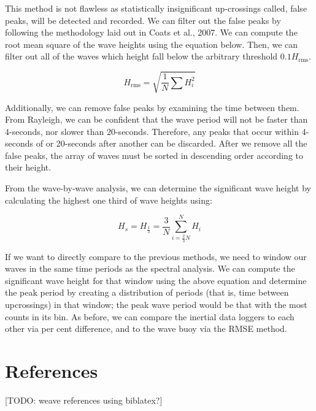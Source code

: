 This method is not flawless as statistically insignificant up-crossings called, false peaks, will be detected and recorded. 
We can filter out the false peaks by following the methodology laid out in Coats et al., 2007. 
We can compute the root mean square of the wave heights using the equation below. 
Then, we can filter out all of the waves which height fall below the arbitrary threshold $0.1H_{\text{rms}}$.

\begin{equation}
    H_{\text{rms}} = \sqrt{\frac{1}{N} \sum{H_i^2}}
\end{equation}

Additionally, we can remove false peaks by examining the time between them. 
From Rayleigh, we can be confident that the wave period will not be faster than 4-seconds, nor slower than 20-seconds. 
Therefore, any peaks that occur within 4-seconds of or 20-seconds after another can be discarded. 
After we remove all the false peaks, the array of waves must be sorted in descending order according to their height.

From the wave-by-wave analysis, we can determine the significant wave height by calculating the highest one third of wave heights using:

\begin{equation}
    H_s = H_{\frac{1}{3}} = \frac{3}{N} \sum_{i=\frac{2}{3}N}^N H_i
\end{equation}

If we want to directly compare to the previous methods, we need to window our waves in the same time periods as the spectral analysis. 
We can compute the significant wave height for that window using the above equation and determine the peak period by creating a distribution of periods (that is, time between upcrossings) in that window; the peak wave period would be that with the most counts in its bin. 
As before, we can compare the inertial data loggers to each other via per cent difference, and to the wave buoy via the RMSE method.

\section{References} 

[TODO: weave references using biblatex?]